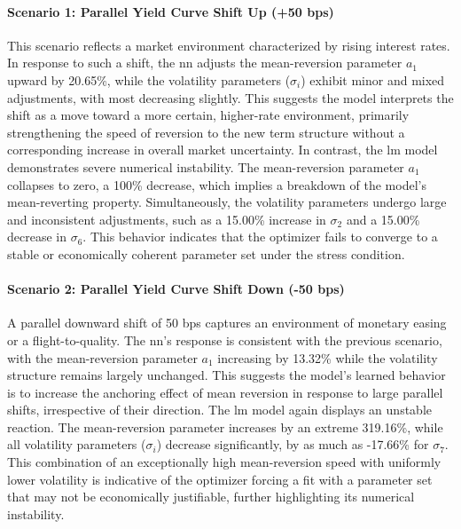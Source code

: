 \paragraph{Scenario 1: Parallel Yield Curve Shift Up (+50 \ac{bps})}
This scenario reflects a market environment characterized by rising interest rates. In response to such a shift, the \ac{nn} adjusts the mean-reversion parameter $a_1$ upward by 20.65\%, while the volatility parameters ($\sigma_i$) exhibit minor and mixed adjustments, with most decreasing slightly. This suggests the model interprets the shift as a move toward a more certain, higher-rate environment, primarily strengthening the speed of reversion to the new term structure without a corresponding increase in overall market uncertainty. In contrast, the \ac{lm} model demonstrates severe numerical instability. The mean-reversion parameter $a_1$ collapses to zero, a 100\% decrease, which implies a breakdown of the model's mean-reverting property. Simultaneously, the volatility parameters undergo large and inconsistent adjustments, such as a 15.00\% increase in $\sigma_2$ and a 15.00\% decrease in $\sigma_6$. This behavior indicates that the optimizer fails to converge to a stable or economically coherent parameter set under the stress condition.

\paragraph{Scenario 2: Parallel Yield Curve Shift Down (-50 \ac{bps})}
A parallel downward shift of 50 \ac{bps} captures an environment of monetary easing or a flight-to-quality. The \ac{nn}'s response is consistent with the previous scenario, with the mean-reversion parameter $a_1$ increasing by 13.32\% while the volatility structure remains largely unchanged. This suggests the model's learned behavior is to increase the anchoring effect of mean reversion in response to large parallel shifts, irrespective of their direction. The \ac{lm} model again displays an unstable reaction. The mean-reversion parameter increases by an extreme 319.16\%, while all volatility parameters ($\sigma_i$) decrease significantly, by as much as -17.66\% for $\sigma_7$. This combination of an exceptionally high mean-reversion speed with uniformly lower volatility is indicative of the optimizer forcing a fit with a parameter set that may not be economically justifiable, further highlighting its numerical instability.

